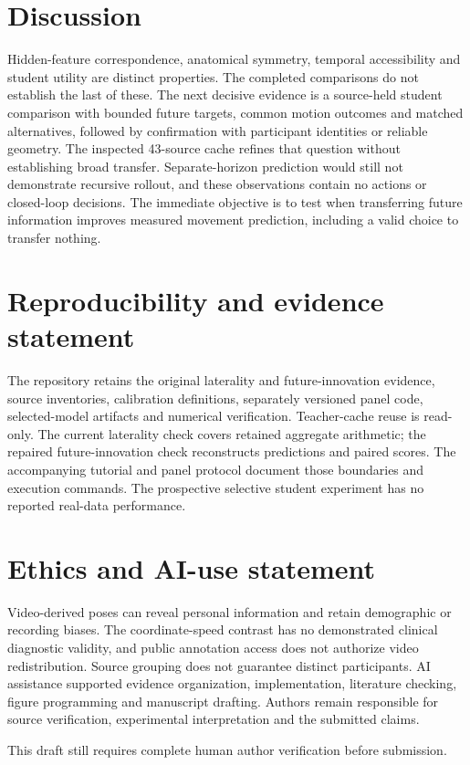 \documentclass{article}
\begin{document}
\section{Discussion}\label{discussion}

Hidden-feature correspondence, anatomical symmetry, temporal accessibility and student utility are distinct properties. The completed comparisons do not establish the last of these. The next decisive evidence is a source-held student comparison with bounded future targets, common motion outcomes and matched alternatives, followed by confirmation with participant identities or reliable geometry. The inspected 43-source cache refines that question without establishing broad transfer. Separate-horizon prediction would still not demonstrate recursive rollout, and these observations contain no actions or closed-loop decisions. The immediate objective is to test when transferring future information improves measured movement prediction, including a valid choice to transfer nothing.

\label{main-text-end}
\clearpage


\section*{Reproducibility and evidence statement}\label{reproducibility-and-evidence-statement}

The repository retains the original laterality and future-innovation evidence, source inventories, calibration definitions, separately versioned panel code, selected-model artifacts and numerical verification. Teacher-cache reuse is read-only. The current laterality check covers retained aggregate arithmetic; the repaired future-innovation check reconstructs predictions and paired scores. The accompanying tutorial and panel protocol document those boundaries and execution commands. The prospective selective student experiment has no reported real-data performance.

\section*{Ethics and AI-use statement}\label{ethics-and-ai-use-statement}

Video-derived poses can reveal personal information and retain demographic or recording biases. The coordinate-speed contrast has no demonstrated clinical diagnostic validity, and public annotation access does not authorize video redistribution. Source grouping does not guarantee distinct participants. AI assistance supported evidence organization, implementation, literature checking, figure programming and manuscript drafting. Authors remain responsible for source verification, experimental interpretation and the submitted claims.

This draft still requires complete human author verification before submission.
\end{document}
